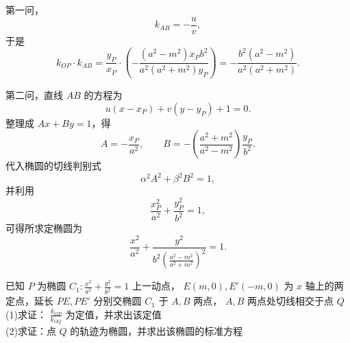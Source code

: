 \begin{solution}
第一问，
$$k_{AB} = -\frac{u}{v},$$
于是
$$k_{OP} \cdot k_{AB} = \frac{y_P}{x_P} \cdot \left( -\frac{(a^2 - m^2) x_P b^2}{a^2(a^2 + m^2) y_P} \right) = -\frac{b^2(a^2 - m^2)}{a^2(a^2 + m^2)}.$$

第二问，直线 $AB$ 的方程为
$$u(x-x_P) + v(y-y_P) + 1 = 0.$$
整理成 $Ax+By=1$，得
$$A = -\frac{x_P}{a^2}, \qquad B = -\left(\frac{a^2+m^2}{a^2-m^2}\right)\frac{y_P}{b^2}.$$
代入椭圆的切线判别式
$$\alpha^2 A^2 + \beta^2 B^2 = 1,$$
并利用
$$\frac{x_P^2}{a^2} + \frac{y_P^2}{b^2} = 1,$$
可得所求定椭圆为
$$\frac{x^2}{a^2} + \frac{y^2}{b^2 \left( \frac{a^2-m^2}{a^2+m^2} \right)^2} = 1.$$
\end{solution}

\begin{exercise}
已知 $P$ 为椭圆 $C_1: \frac{x^2}{a^2} + \frac{y^2}{b^2} = 1$ 上一动点， $E(m,0), E'(-m,0)$ 为 $x$ 轴上的两定点，延长 $PE, PE'$ 分别交椭圆 $C_1$ 于 $A,B$ 两点， $A,B$ 两点处切线相交于点 $Q$\\
(1)求证： $\frac{k_{O P}}{k_{O Q}}$ 为定值，并求出该定值\\
(2)求证：点 $Q$ 的轨迹为椭圆，并求出该椭圆的标准方程
\end{exercise}
